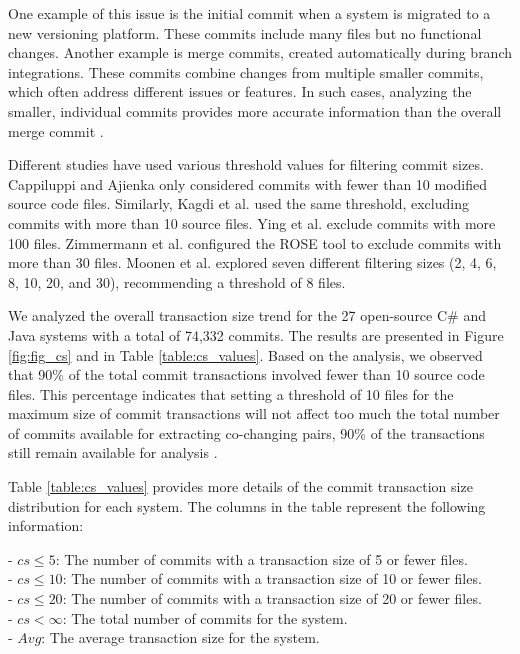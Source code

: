 One example of this issue is the initial commit when a system is migrated to a new versioning platform. These commits include many files but no functional changes. Another example is merge commits, created automatically during branch integrations. These commits combine changes from multiple smaller commits, which often address different issues or features. In such cases, analyzing the smaller, individual commits provides more accurate information than the overall merge commit \cite{cluster-access}.

Different studies have used various threshold values for filtering commit sizes. Cappiluppi and Ajienka \cite{DBLP:journals/jss/AjienkaC17, DBLP:journals/ese/AjienkaCC18} only considered commits with fewer than 10 modified source code files. Similarly, Kagdi et al. used the same threshold, excluding commits with more than 10 source files. Ying et al. \cite{Ying-co-change} exclude commits with more 100 files. Zimmermann et al. \cite{Zimmermann:2004:MVH:998675.999460} configured the ROSE tool to exclude commits with more than 30 files. Moonen et al. \cite{Moonen-commit} explored seven different filtering sizes (2, 4, 6, 8, 10, 20, and 30), recommending a threshold of 8 files.



We analyzed the overall transaction size trend for the 27 open-source C\# and Java systems with a total of 74,332 commits. The results are presented in Figure \ref{fig:fig_cs} and in Table \ref{table:cs_values}. Based on the analysis, we observed that 90\% of the total commit transactions involved fewer than 10 source code files. This percentage indicates that setting a threshold of 10 files for the maximum size of commit transactions will not affect too much the total number of commits available for extracting co-changing pairs, 90\% of the transactions still remain available for analysis \cite{DepSACI, enase19}.

Table \ref{table:cs_values} provides more details of the commit transaction size distribution for each system. The columns in the table represent the following information:

\hspace{-4em}- \textit{$cs\leq 5$}: The number of commits with a transaction size of 5 or fewer files. \\
- \textit{$cs\leq 10$}: The number of commits with a transaction size of 10 or fewer files. \\
- \textit{$cs\leq 20$}: The number of commits with a transaction size of 20 or fewer files. \\
- \textit{$cs<\infty$}: The total number of commits for the system. \\
- \textit{$Avg$}: The average transaction size for the system.


